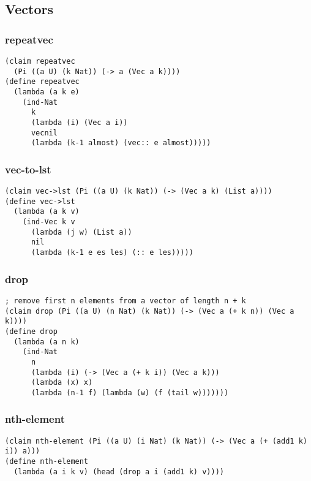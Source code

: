 \subsection{Vectors}

\subsubsection{repeatvec} \label{code:repeatvec}
\begin{lstlisting}
(claim repeatvec
  (Pi ((a U) (k Nat)) (-> a (Vec a k))))
(define repeatvec
  (lambda (a k e)
    (ind-Nat
      k
      (lambda (i) (Vec a i))
      vecnil
      (lambda (k-1 almost) (vec:: e almost)))))
\end{lstlisting}

\subsubsection{vec-to-lst} \label{code:vec-to-lst}
\begin{lstlisting}
(claim vec->lst (Pi ((a U) (k Nat)) (-> (Vec a k) (List a))))
(define vec->lst
  (lambda (a k v)
    (ind-Vec k v
      (lambda (j w) (List a))
      nil
      (lambda (k-1 e es les) (:: e les)))))
\end{lstlisting}

\subsubsection{drop} \label{code:drop}
\begin{lstlisting}
; remove first n elements from a vector of length n + k
(claim drop (Pi ((a U) (n Nat) (k Nat)) (-> (Vec a (+ k n)) (Vec a k))))
(define drop
  (lambda (a n k)
    (ind-Nat
      n
      (lambda (i) (-> (Vec a (+ k i)) (Vec a k)))
      (lambda (x) x)
      (lambda (n-1 f) (lambda (w) (f (tail w)))))))
\end{lstlisting}

\subsubsection{nth-element} \label{code:nth-element}
\begin{lstlisting}
(claim nth-element (Pi ((a U) (i Nat) (k Nat)) (-> (Vec a (+ (add1 k) i)) a)))
(define nth-element
  (lambda (a i k v) (head (drop a i (add1 k) v))))
\end{lstlisting}

